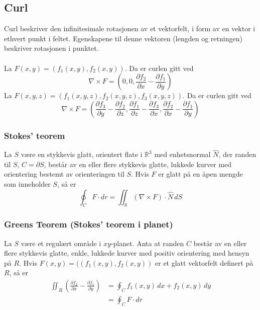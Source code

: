 \documentclass{article}
\begin{document}
\subsection{Curl}
Curl beskriver den infinitesimale rotasjonen av et vektorfelt, i form av en vektor i ethvert punkt i feltet. Egenskapene til denne vektoren (lengden og retningen) beskriver rotasjonen i punktet.\\\\
La $F(x, y) = \left(f_1(x, y), f_2(x, y)\right)$. Da er curlen gitt ved
\[\nabla \times F = \left(0, 0, \frac{\partial f_2}{\partial x} - \frac{\partial f_1}{\partial y} \right)\]
La $F(x, y, z) = \left(f_1(x, y, z), f_2(x, y, z), f_3(x, y, z)\right)$. Da er curlen gitt ved
\[\nabla \times F = \left( \frac{\partial f_3}{\partial y} - \frac{\partial f_2}{\partial z}, \frac{\partial f_1}{\partial z} - \frac{\partial f_3}{\partial x}, \frac{\partial f_2}{\partial x} - \frac{\partial f_1}{\partial y} \right)\]

\subsubsection{Stokes' teorem} \label{Stokes' teorem}
La $S$ være en stykkevis glatt, orientert flate i $\mathbb{R}^3$ med enhetsnormal $\hat{N}$, der randen til $S$, $C = \partial S$, består av en eller flere stykkevis glatte, lukkede kurver med orientering bestemt av orienteringen til $S$. Hvis $F$ er glatt på en åpen mengde som inneholder $S$, så er
\[\oint_C F \cdot dr = \iint_S (\nabla \times F) \cdot \hat{N}\,dS\]

\subsubsection{Greens Teorem (Stokes' teorem i planet)} \label{Greens Teorem}
La $S$ være et regulært område i $xy$-planet. Anta at randen $C$ består av en eller flere stykkevis glatte, enkle, lukkede kurver med positiv orientering med hensyn på $R$. Hvis $F(x, y) = ((f_1(x, y), f_2(x, y))$ er et glatt vektorfelt definert på $R$, så er
\begin{align*}
    \iint_R \left( \frac{\partial f_2}{\partial x} - \frac{\partial f_1}{\partial y} \right) &= \oint_C f_1(x, y)\,dx + f_2(x, y)\,dy\\
    &= \oint_C F \cdot dr
\end{align*}
\end{document}
